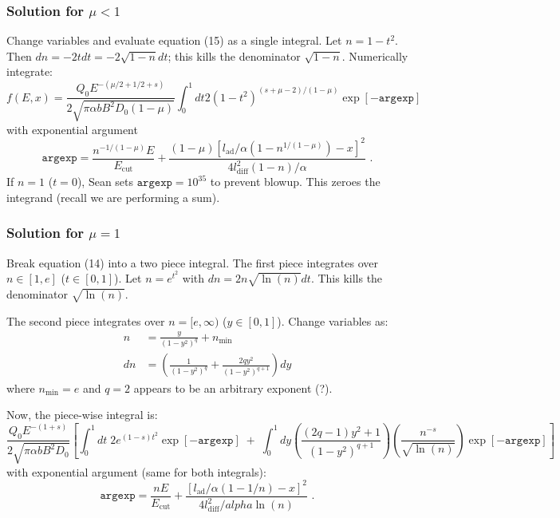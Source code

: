 \documentclass[10pt]{article}
\newcommand{\mt}{\mathrm}
\begin{document}
\subsubsection{Solution for \texorpdfstring{$\mu < 1$}{mu lt 1}}
Change variables and evaluate equation (15) as a single integral.
Let $n = 1 - t^2$. Then $dn = -2t dt = -2\sqrt{1-n}dt$;
this kills the denominator $\sqrt{1-n}$.  Numerically integrate:
\[
    f(E,x) = \frac{Q_0 E^{-(\mu/2 + 1/2 + s)}}
            {2 \sqrt{\pi \alpha b B^2 D_0 (1-\mu)}} 
            \int_0^1 dt 2 (1-t^2)^{ (s+\mu-2) / (1-\mu) }
            \exp[ - \mathtt{argexp} ]
\]
with exponential argument
\[
    \mathtt{argexp} = \frac{n^{-1/(1-\mu)} E}{E_{\mt{cut}}}
    + \frac{(1 - \mu)
        \left[ l_{\mt{ad}}/\alpha \left(1 - n^{1/(1-\mu)}\right) - x \right]^2}
        {4 l_{\mt{diff}}^2 (1-n) / \alpha}
    \text{ .}
\]
If $n=1$ ($t=0$), Sean sets $\mathtt{argexp} = 10^{35}$ to prevent blowup.
This zeroes the integrand (recall we are performing a sum).

\subsubsection{Solution for \texorpdfstring{$\mu = 1$}{mu eq 1}}
Break equation (14) into a two piece integral.
The first piece integrates over $n\in [1,e]$ ($t\in[0,1]$).
Let $n = e^{t^2}$ with $dn = 2 n \sqrt{\ln(n)} dt$.
This kills the denominator $\sqrt{\ln(n)}$.

The second piece integrates over $n=[e,\infty)$ ($y\in[0,1]$).
Change variables as:
\begin{align*}
    n &= \frac{y}{(1-y^2)^q} + n_{\mt{min}} \\
    dn &= \left( \frac{1}{(1-y^2)^q} + \frac{2qy^2}{(1 - y^2)^{q+1}} \right) dy
\end{align*}
where $n_{\mt{min}} = e$ and $q = 2$ appears to be an arbitrary exponent (?).

Now, the piece-wise integral is:
\[
    \frac{Q_0 E^{-(1+s)}}
         { 2 \sqrt{ \pi \alpha b B^2 D_0 } }
    \left[
        \int_0^1 dt \; 2 e^{(1-s) t^2} \exp[ - \mathtt{argexp} ]
        \; + \;
        \int_0^1 dy \left(\frac{(2q-1) y^2 + 1}{(1 - y^2)^{q+1}}\right)
                    \left(\frac{n^{-s}}{ \sqrt{\ln(n)} }\right)
                    \exp[ - \mathtt{argexp} ]
    \right]
\]
with exponential argument (same for both integrals):
\[
    \mathtt{argexp} = \frac{n E}{E_{\mt{cut}}}
        + \frac{ \left[ l_{\mt{ad}}/\alpha (1 - 1/n) - x \right]^2 }
        { 4 l_{\mt{diff}}^2 /alpha \ln(n) }
    \text{ .}
\]
\end{document}
